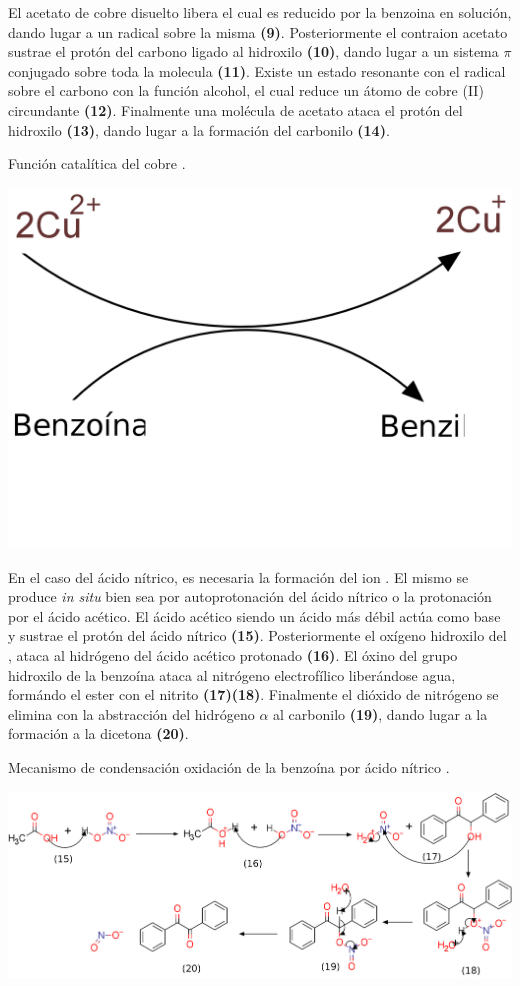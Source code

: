 \documentclass[fleqn,10pt]{SelfArx}
\begin{document}
El acetato de cobre disuelto libera  el cual es reducido por la benzoina en soluci\'on, dando lugar a un radical sobre la misma \textbf{(9)}. Posteriormente el contraion acetato sustrae el prot\'on del carbono ligado al hidroxilo \textbf{(10)}, dando lugar a un sistema $\pi$ conjugado sobre toda la molecula \textbf{(11)}. Existe un estado resonante con el radical sobre el carbono con la funci\'on alcohol, el cual reduce un \'atomo de cobre (II) circundante \textbf{(12)}. Finalmente una mol\'ecula de acetato ataca el prot\'on del hidroxilo \textbf{(13)}, dando lugar a la formaci\'on del carbonilo \textbf{(14)}.
\begin{scheme}[h]
	\centering
	\caption{Funci\'on catal\'itica del cobre \cite{wigal2000}.}
	\includegraphics[width=0.5\linewidth]{structures/coppercycle.png}
\end{scheme}


En el caso del \'acido n\'itrico, es necesaria la formaci\'on del ion . El mismo se produce \textit{in situ} bien sea por autoprotonaci\'on del \'acido n\'itrico o la protonaci\'on por el \'acido ac\'etico. El \'acido ac\'etico siendo un \'acido m\'as d\'ebil act\'ua como base y sustrae el prot\'on del \'acido n\'itrico \textbf{(15)}. Posteriormente el ox\'igeno hidroxilo del , ataca al hidr\'ogeno del \'acido ac\'etico protonado \textbf{(16)}. El \'oxino del grupo hidroxilo de la benzo\'ina ataca al nitr\'ogeno electrof\'ilico liber\'andose agua, form\'ando el ester con el nitrito \textbf{(17)(18)}. Finalmente el di\'oxido de nitr\'ogeno se elimina con la abstracci\'on del hidr\'ogeno $\alpha$ al carbonilo \textbf{(19)}, dando lugar a la formaci\'on a la dicetona \textbf{(20)}.
\begin{scheme}[h]
	\centering
	\caption{Mecanismo de condensaci\'on oxidaci\'on de la benzo\'ina por \'acido n\'itrico \cite{pavia2010}.}
	\includegraphics[width=\linewidth]{structures/mechanism-oxidation.png}
\end{scheme}
\end{document}
